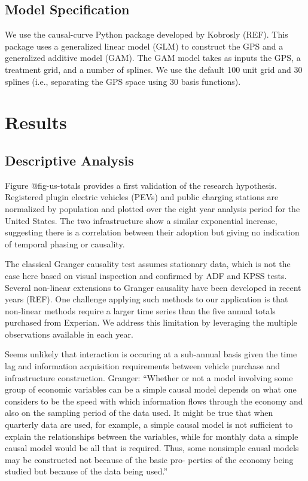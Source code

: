 \documentclass[
  letterpaper,
  DIV=11,
  numbers=noendperiod]{scrartcl}
\begin{document}
\hypertarget{model-specification}{%
\subsection{Model Specification}\label{model-specification}}

We use the causal-curve Python package developed by Kobrosly (REF). This
package uses a generalized linear model (GLM) to construct the GPS and a
generalized additive model (GAM). The GAM model takes as inputs the GPS,
a treatment grid, and a number of splines. We use the default 100 unit
grid and 30 splines (i.e., separating the GPS space using 30 basis
functions).

\hypertarget{results}{%
\section{Results}\label{results}}

\hypertarget{descriptive-analysis}{%
\subsection{Descriptive Analysis}\label{descriptive-analysis}}

Figure @fig-us-totals provides a first validation of the research
hypothesis. Registered plugin electric vehicles (PEVs) and public
charging stations are normalized by population and plotted over the
eight year analysis period for the United States. The two infrastructure
show a similar exponential increase, suggesting there is a correlation
between their adoption but giving no indication of temporal phasing or
causality.

The classical Granger causality test assumes stationary data, which is
not the case here based on visual inspection and confirmed by ADF and
KPSS tests. Several non-linear extensions to Granger causality have been
developed in recent years (REF). One challenge applying such methods to
our application is that non-linear methods require a larger time series
than the five annual totals purchased from Experian. We address this
limitation by leveraging the multiple observations available in each
year.

Seems unlikely that interaction is occuring at a sub-annual basis given
the time lag and information acquisition requirements between vehicle
purchase and infrastructure construction. Granger: ``Whether or not a
model involving some group of economic variables can be a simple causal
model depends on what one considers to be the speed with which
information flows through the economy and also on the sampling period of
the data used. It might be true that when quarterly data are used, for
example, a simple causal model is not sufficient to explain the
relationships between the variables, while for monthly data a simple
causal model would be all that is required. Thus, some nonsimple causal
models may be constructed not because of the basic pro- perties of the
economy being studied but because of the data being used.''
\end{document}
